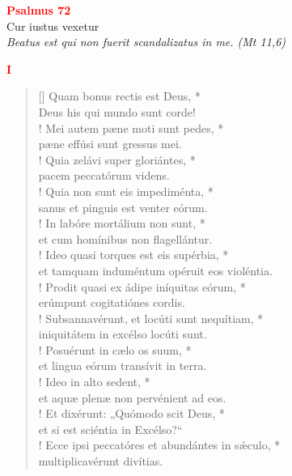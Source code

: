 


\def\greinitialformat#1{%
{\fontsize{39}{39}\selectfont #1}%
}




\vspace{0.3cm}
\begin{center}
 \textcolor{red}{\large \bf Psalmus 72}\\
Cur iustus vexetur\\
\textit{\small Beatus est qui non fuerit scandalizatus in me. (Mt 11,6)}
\end{center}
\begin{center}
\textcolor{red}{\bf I}
\end{center}
\begin{verse}[\versewidth]
Quam bonus rectis est Deus, *\\
Deus his qui mundo sunt corde!\\!
\vin Mei autem pæne moti sunt pedes, *\\
\vin pæne effúsi sunt gressus mei.\\!
Quia zelávi super gloriántes, *\\
pacem peccatórum videns.\\!
\vin Quia non sunt eis impediménta, *\\
\vin sanus et pinguis est venter eórum.\\!
In labóre mortálium non sunt, *\\
et cum homínibus non flagellántur.\\!
\vin Ideo quasi torques est eis supérbia, *\\
\vin et tamquam induméntum opéruit eos violéntia.\\!
Prodit quasi ex ádipe iníquitas eórum, *\\
erúmpunt cogitatiónes cordis.\\!
\vin Subsannavérunt, et locúti sunt nequítiam, *\\
\vin iniquitátem in excélso locúti sunt.\\!
Posuérunt in cælo os suum, *\\
et lingua eórum transívit in terra.\\!
\vin Ideo in alto sedent, *\\
\vin et aquæ plenæ non pervénient ad eos.\\!
Et dixérunt: „Quómodo scit Deus, *\\
et si est sciéntia in Excélso?“\\!
\vin Ecce ipsi peccatóres et abundántes in s\'{æ}culo, *\\
\vin multiplicavérunt divítias.\\
\end{verse}
